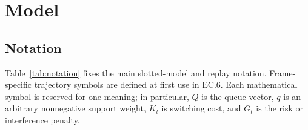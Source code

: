 \documentclass[opre,dblanonrev]{informs4}
\begin{document}
\section{Model}
\label{sec:model}

\subsection{Notation}
\label{subsec:notation}

Table~\ref{tab:notation} fixes the main slotted-model and replay notation.
Frame-specific trajectory symbols are defined at first use in
EC.6.  Each mathematical symbol is reserved for one meaning; in particular,
\(Q\) is the queue vector, \(q\) is an arbitrary nonnegative support weight,
\(K_t\) is switching cost, and \(G_t\) is the risk or interference penalty.
\end{document}
